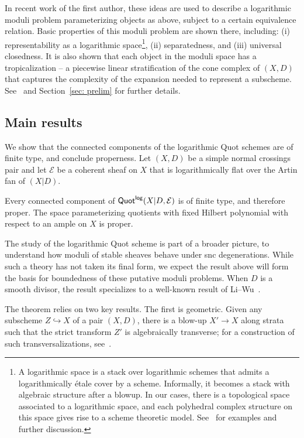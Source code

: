 \documentclass[11pt]{amsart}
\theoremstyle{definition}
\newenvironment{customthm}[1]
{\renewcommand\theinnercustomthm{#1}\innercustomthm}
{\endinnercustomthm}
\theoremstyle{definition}
\begin{document}
In recent work of the first author, these ideas are used to describe a logarithmic moduli problem parameterizing objects as above, subject to a certain equivalence relation. Basic properties of this moduli problem are shown there, including: (i) representability as a logarithmic space\footnote{A logarithmic space is a stack over logarithmic schemes that admits a logarithmically \'etale cover by a scheme. Informally, it becomes a stack with algebraic structure after a blowup. In our cases, there is a topological space associated to a logarithmic space, and each polyhedral complex structure on this space gives rise to a scheme theoretic model.  See~\cite{Logquot,MW23,MolchoWise} for examples and further discussion.}, (ii) separatedness, and (iii) universal closedness. It is also shown that each object in the moduli space has a tropicalization -- a piecewise linear stratification of the cone complex of $(X,D)$ that captures the complexity of the expansion needed to represent a subscheme. See~\cite{Logquot} and Section~\ref{sec: prelim} for further details.

\subsection{Main results} We show that the connected components of the logarithmic Quot schemes are of finite type, and conclude properness. Let $(X,D)$ be a simple normal crossings pair and let $\mathcal E$ be a coherent sheaf on $X$ that is logarithmically flat over the Artin fan of $(X|D)$. 

\begin{customthm}{A}[Boundedness]\label{thm: boundedness-quot-scheme}
Every connected component of $\mathsf{Quot}^{\sf log}(X|D,\mathcal E)$ is of finite type, and therefore proper. The space parameterizing quotients with fixed Hilbert polynomial with respect to an ample on $X$ is proper. 
\end{customthm}

The study of the logarithmic Quot scheme is part of a broader picture, to understand how moduli of stable sheaves behave under snc degenerations. While such a theory has not taken its final form, we expect the result above will form the basis for boundedness of these putative moduli problems. When $D$ is a smooth divisor, the result specializes to a well-known result of Li--Wu~\cite{LiWu}.

The theorem relies on two key results. The first is geometric. Given any subscheme $Z\hookrightarrow X$ of a pair $(X,D)$, there is a blow-up $X'\to X$ along strata such that the strict transform $Z'$ is algebraically transverse; for a construction of such transversalizations, see~\cite{Logquot,tevelev2005compactifications,TevNotes,TV21}. 
\end{document}
